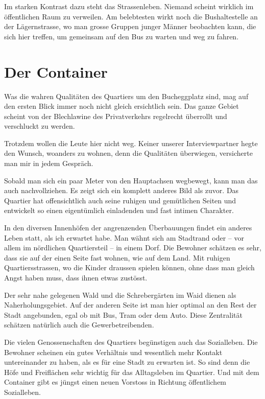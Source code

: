 \documentclass[a4paper,ngerman,11pt]{scrartcl}
\begin{document}
Im starken Kontrast dazu steht das Strassenleben. Niemand scheint wirklich im
öffentlichen Raum zu verweilen. Am belebtesten wirkt noch die Bushaltestelle an
der Lägernstrasse, wo man grosse Gruppen junger Männer beobachten kann, die
sich hier treffen, um gemeinsam auf den Bus zu warten und weg zu fahren.

\section*{Der Container}

Was die wahren Qualitäten des Quartiers um den Bucheggplatz sind, mag auf
den ersten Blick immer noch nicht gleich ersichtlich sein. Das ganze Gebiet
scheint von der Blechlawine des Privatverkehrs regelrecht überrollt und
verschluckt zu werden.

Trotzdem wollen die Leute hier nicht weg. Keiner unserer Interviewpartner hegte
den Wunsch, woanders zu wohnen, denn die Qualitäten überwiegen, versicherte man
mir in jedem Gespräch.

Sobald man sich ein paar Meter von den Hauptachsen wegbewegt, kann man das auch
nachvollziehen. Es zeigt sich ein komplett anderes Bild als zuvor. Das Quartier
hat offensichtlich auch seine ruhigen und gemütlichen Seiten und entwickelt so
einen eigentümlich einladenden und fast intimen Charakter.


In den diversen Innenhöfen der angrenzenden Überbauungen findet ein anderes
Leben statt, als ich erwartet habe. Man wähnt sich am Stadtrand oder – vor allem
im nördlichen Quartiersteil – in einem Dorf.  Die Bewohner schätzen es sehr,
dass sie auf der einen Seite fast wohnen, wie auf dem Land. Mit ruhigen
Quartiersstrassen, wo die Kinder draussen spielen können, ohne dass man gleich
Angst haben muss, dass ihnen etwas zustösst.

Der sehr nahe gelegenen Wald und die Schrebergärten im Waid dienen als
Naherholungsgebiet. Auf der anderen Seite ist man hier optimal an den Rest der
Stadt angebunden, egal ob mit Bus, Tram oder dem Auto. Diese Zentralität
schätzen natürlich auch die Gewerbetreibenden.

Die vielen Genossenschaften des Quartiers begünstigen auch das Sozialleben. Die
Bewohner scheinen ein gutes Verhältnis und wesentlich mehr Kontakt untereinander
zu haben, als es für eine Stadt zu erwarten ist. So sind denn die Höfe und
Freiflächen sehr wichtig für das Alltagsleben im Quartier. Und mit dem Container
gibt es jüngst einen neuen Vorstoss in Richtung öffentlichem Sozialleben.
\end{document}
